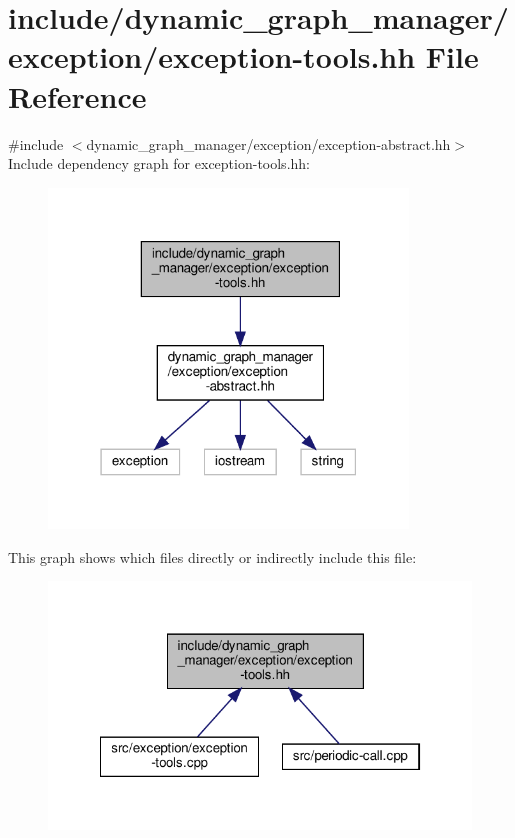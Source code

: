\hypertarget{exception-tools_8hh}{}\section{include/dynamic\+\_\+graph\+\_\+manager/exception/exception-\/tools.hh File Reference}
\label{exception-tools_8hh}
{\ttfamily \#include $<$dynamic\+\_\+graph\+\_\+manager/exception/exception-\/abstract.\+hh$>$}\newline
Include dependency graph for exception-\/tools.hh\+:
\nopagebreak
\begin{figure}[H]
\begin{center}
\leavevmode
\includegraphics[width=271pt]{exception-tools_8hh__incl}
\end{center}
\end{figure}
This graph shows which files directly or indirectly include this file\+:
\nopagebreak
\begin{figure}[H]
\begin{center}
\leavevmode
\includegraphics[width=322pt]{exception-tools_8hh__dep__incl}
\end{center}
\end{figure}
